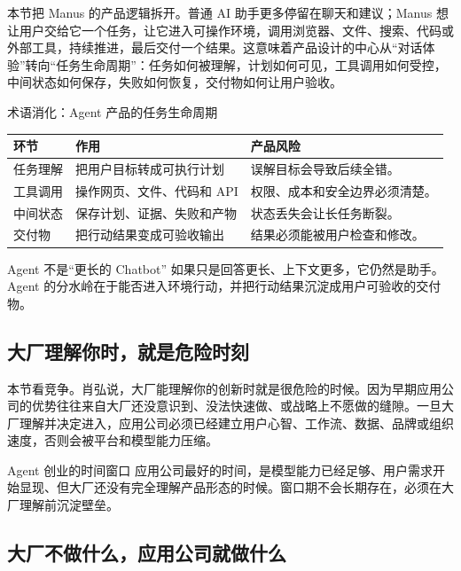 本节把 Manus 的产品逻辑拆开。普通 AI 助手更多停留在聊天和建议；Manus 想让用户交给它一个任务，让它进入可操作环境，调用浏览器、文件、搜索、代码或外部工具，持续推进，最后交付一个结果。这意味着产品设计的中心从“对话体验”转向“任务生命周期”：任务如何被理解，计划如何可见，工具调用如何受控，中间状态如何保存，失败如何恢复，交付物如何让用户验收。

\begin{knowledgebox}{术语消化：Agent 产品的任务生命周期}
\noindent\begin{tabularx}{\textwidth}{p{}p{}X}
\toprule
环节 & 作用 & 产品风险 \\
\midrule
任务理解 & 把用户目标转成可执行计划 & 误解目标会导致后续全错。 \\
工具调用 & 操作网页、文件、代码和 API & 权限、成本和安全边界必须清楚。 \\
中间状态 & 保存计划、证据、失败和产物 & 状态丢失会让长任务断裂。 \\
交付物 & 把行动结果变成可验收输出 & 结果必须能被用户检查和修改。 \\
\bottomrule
\end{tabularx}
\end{knowledgebox}

\begin{warningbox}{Agent 不是“更长的 Chatbot”}
如果只是回答更长、上下文更多，它仍然是助手。Agent 的分水岭在于能否进入环境行动，并把行动结果沉淀成用户可验收的交付物。
\end{warningbox}

\subsection{大厂理解你时，就是危险时刻}

本节看竞争。肖弘说，大厂能理解你的创新时就是很危险的时候。因为早期应用公司的优势往往来自大厂还没意识到、没法快速做、或战略上不愿做的缝隙。一旦大厂理解并决定进入，应用公司必须已经建立用户心智、工作流、数据、品牌或组织速度，否则会被平台和模型能力压缩。

\begin{importantbox}{Agent 创业的时间窗口}
应用公司最好的时间，是模型能力已经足够、用户需求开始显现、但大厂还没有完全理解产品形态的时候。窗口期不会长期存在，必须在大厂理解前沉淀壁垒。
\end{importantbox}

\subsection{大厂不做什么，应用公司就做什么}


